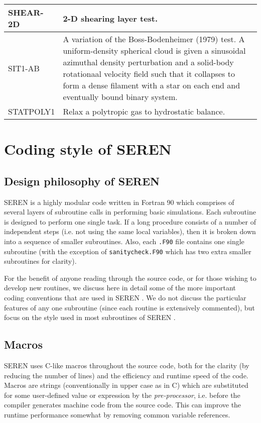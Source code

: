 \documentclass[a4paper]{article}
\newcommand{\NAME}{SEREN }
\newcommand{\var}[1]{\texttt{#1}}
\begin{document}
\begin{center}
\begin{supertabular}{|p{3cm}|p{10cm}|}
SHEAR-2D & 2-D shearing layer test. \\ \hline

SIT1-AB  & A variation of the Boss-Bodenheimer (1979) test.  
           A uniform-density spherical cloud is given a sinusoidal azimuthal 
           density perturbation and a solid-body rotationaal velocity field 
           such that it collapses to form a dense filament with a star on 
           each end and eventually bound binary system. \\ \hline

STATPOLY1 & Relax a polytropic gas to hydrostatic balance. \\ \hline

\end{supertabular}
\end{center}

\newpage


\section{Coding style of \NAME}


\subsection{Design philosophy of \NAME}
\NAME is a highly modular code written in Fortran 90 which comprises of several layers of subroutine calls in performing basic simulations.  Each subroutine is designed to perform one single task.  If a long procedure consists of a number of independent steps (i.e. not using the same local variables), then it is broken down into a sequence of smaller subroutines.  Also, each \var{.F90} file contains one single subroutine (with the exception of \var{sanitycheck.F90} which has two extra smaller subroutines for clarity).

For the benefit of anyone reading through the source code, or for those wishing to develop new routines, we discuss here in detail some of the more important coding conventions that are used in \NAME.  We do not discuss the particular features of any one subroutine (since each routine is extensively commented), but focus on the style used in most subroutines of \NAME.  


\subsection{Macros} \label{SS:MACROS}
\NAME uses C-like macros throughout the source code, both for the clarity (by reducing the number of lines) and the efficiency and runtime speed of the code.  Macros are strings (conventionally in upper case as in C) which are substituted for some user-defined value or expression by the {\it pre-processor}, i.e. before the compiler generates machine code from the source code.  This can improve the runtime performance somewhat by removing common variable references.  
\end{document}
